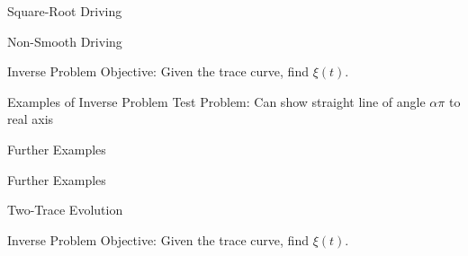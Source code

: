 \documentclass{beamer}
\begin{document}
\begin{frame}{Square-Root Driving}
\begin{adjustbox}{max totalsize={\textwidth}{\textheight}}

\end{adjustbox}
\end{frame}

\begin{frame}{Non-Smooth Driving}
\begin{adjustbox}{max totalsize={\textwidth}{\textheight}}

\end{adjustbox}
\end{frame}

\begin{frame}{Inverse Problem}
    Objective: Given the trace curve, find $\xi(t)$.
\begin{adjustbox}{max totalsize={\textwidth}{\textheight}}

\end{adjustbox}
\end{frame}

\begin{frame}{Examples of Inverse Problem}
Test Problem: Can show straight line of angle $\alpha \pi$ to real axis
\end{frame}

\begin{frame}{Further Examples}
\end{frame}

\begin{frame}{Further Examples}
\end{frame}

\begin{frame}{Two-Trace Evolution}
\end{frame}

\begin{frame}{Inverse Problem}
    Objective: Given the trace curve, find $\xi(t)$.
\begin{adjustbox}{max totalsize={\textwidth}{\textheight}}

\end{adjustbox}
\end{frame}
\end{document}
